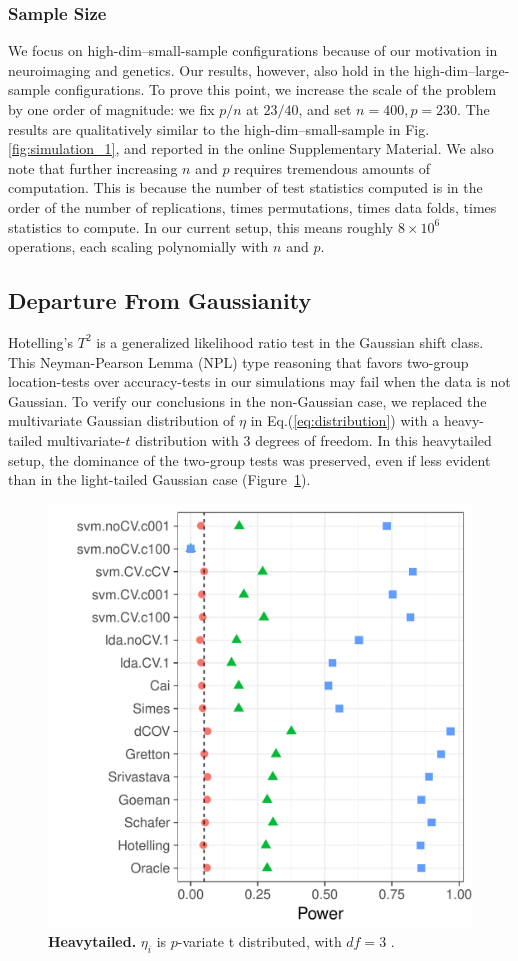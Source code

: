 \documentclass[]{bio}
\begin{document}
\subsubsection{Sample Size}
We focus on high-dim--small-sample configurations because of our motivation in neuroimaging and genetics. 
Our results, however, also  hold in the high-dim--large-sample configurations.
To prove this point, we increase the scale of the problem by one order of magnitude: we fix $p/n$ at $23/40$, and set $n=400, p=230$. 
The results are qualitatively similar to the high-dim--small-sample in Fig.\ref{fig:simulation_1}, and reported in the online Supplementary Material.
We also note that further increasing $n$ and $p$ requires tremendous amounts of computation. 
This is because the number of test statistics computed is in the order of the number of replications, times permutations, times data folds, times statistics to compute. 
In our current setup, this means roughly $8 \times 10^6$ operations, each scaling polynomially with $n$ and $p$. 


\subsection{Departure From Gaussianity}
\label{sec:heavytailed}
Hotelling's $T^2$ is a generalized likelihood ratio test in the Gaussian shift class. 
This Neyman-Pearson Lemma (NPL) type reasoning that favors two-group location-tests over accuracy-tests in our simulations may fail when the data is not Gaussian.
To verify our conclusions in the non-Gaussian case, we replaced the multivariate Gaussian distribution of $\eta$ in Eq.(\ref{eq:distribution}) with a heavy-tailed multivariate-$t$ distribution with $3$ degrees of freedom.
In this heavytailed setup, the dominance of the two-group tests was preserved, even if less evident than in the light-tailed Gaussian case (Figure~\ref{fig:t_null}).

\begin{figure}[th]
	\centering
	\includegraphics[width=0.5\columnwidth]{"art/file9"}
	\caption{\textbf{Heavytailed.} $\eta_i$ is $p$-variate t distributed, with $df=3$ .  } 
	\label{fig:t_null}
\end{figure}
\end{document}
